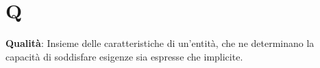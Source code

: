 \section*{Q}
\textbf{Qualità}: Insieme delle caratteristiche di un'entità, che ne determinano la capacità di soddisfare esigenze sia espresse che implicite.\\